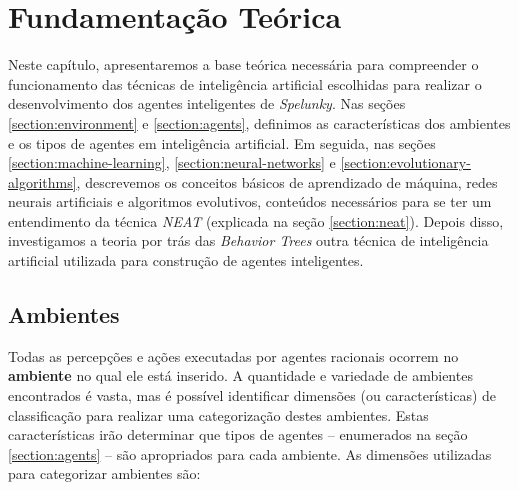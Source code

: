 \chapter{\label{chap:theory}Fundamentação Teórica}
Neste capítulo, apresentaremos a base teórica necessária para compreender o
funcionamento das técnicas de inteligência artificial escolhidas para realizar o
desenvolvimento dos agentes inteligentes de \textit{Spelunky}. Nas seções
\ref{section:environment} e \ref{section:agents}, definimos as características
dos ambientes e os tipos de agentes em inteligência artificial. Em seguida, nas
seções \ref{section:machine-learning}, \ref{section:neural-networks} e
\ref{section:evolutionary-algorithms}, descrevemos os conceitos básicos de
aprendizado de máquina, redes neurais artificiais e algoritmos evolutivos,
conteúdos necessários para se ter um entendimento da técnica \textit{NEAT}
(explicada na seção \ref{section:neat}). Depois disso, investigamos a teoria por
trás das \textit{Behavior Trees} outra técnica de inteligência artificial
utilizada para construção de agentes inteligentes.


\section{\label{section:environment}Ambientes}
Todas as percepções e ações executadas por agentes racionais ocorrem no
\textbf{ambiente} no qual ele está inserido. A quantidade e variedade de
ambientes encontrados é vasta, mas é possível identificar dimensões (ou
características) de classificação para realizar uma categorização destes
ambientes. Estas características irão determinar que tipos de agentes --
enumerados na seção \ref{section:agents} -- são apropriados para cada ambiente.
As dimensões utilizadas para categorizar ambientes são:

